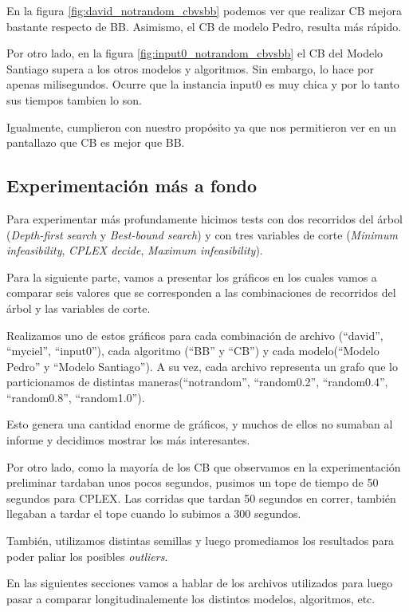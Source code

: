 \documentclass[a4paper, 10pt, twoside]{article}
\begin{document}
En la figura \ref{fig:david_notrandom_cbvsbb} podemos ver que realizar CB mejora bastante respecto de BB. Asimismo, el CB de modelo Pedro, resulta más rápido.

Por otro lado, en la figura \ref{fig:input0_notrandom_cbvsbb} el CB del Modelo Santiago supera a los otros modelos y algoritmos. Sin embargo, lo hace por apenas milisegundos. Ocurre que la instancia input0 es muy chica y por lo tanto sus tiempos tambien lo son.

Igualmente, cumplieron con nuestro propósito ya que nos permitieron ver en un pantallazo que CB es mejor que BB.

\subsection{Experimentación más a fondo}

Para experimentar más profundamente hicimos tests con dos recorridos del árbol (\emph{Depth-first search} y \emph{Best-bound search}) y con tres variables de corte (\emph{Minimum infeasibility}, \emph{CPLEX decide}, \emph{Maximum infeasibility}).

Para la siguiente parte, vamos a presentar los gráficos en los cuales vamos a comparar seis valores que se corresponden a las combinaciones de recorridos del árbol y las variables de corte.

Realizamos uno de estos gráficos para cada combinación de archivo (``david'', ``myciel'',  ``input0''), cada algoritmo (``BB'' y ``CB'') y cada modelo(``Modelo Pedro'' y ``Modelo Santiago''). A su vez, cada archivo representa un grafo que lo particionamos de distintas maneras(``notrandom'', ``random0.2'', ``random0.4'', ``random0.8'', ``random1.0'').

Esto genera una cantidad enorme de gráficos, y muchos de ellos no sumaban al informe y decidimos mostrar los más interesantes.

Por otro lado, como la mayoría de los CB que observamos en la experimentación preliminar tardaban unos pocos segundos, pusimos un tope de tiempo de 50 segundos para CPLEX. Las corridas que tardan 50 segundos en correr, también llegaban a tardar el tope cuando lo subimos a 300 segundos.

También, utilizamos distintas semillas y luego promediamos los resultados para poder paliar los posibles \textit{outliers}.

En las siguientes secciones vamos a hablar de los archivos utilizados para luego pasar a comparar longitudinalemente los distintos modelos, algoritmos, etc. 
\end{document}

